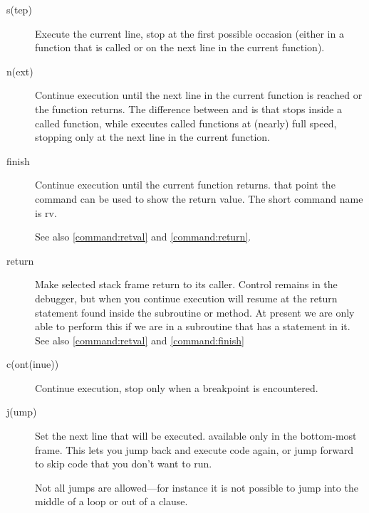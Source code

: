 \begin{description}

\item[s(tep) ]

Execute the current line, stop at the first possible occasion
(either in a function that is called or on the next line in the
current function).

\item[n(ext) ]

Continue execution until the next line in the current function
is reached or the function returns.  The difference between  and
 is that  stops inside a called function, while
 executes called functions at (nearly) full speed, 
stopping only at the next line in the current function.

\item[finish]\label{command:finish}

Continue execution until the current function returns.
that point the  command can be used to show the
return value. The short command name is rv.

See also \ref{command:retval} and \ref{command:return}.

\item[return]\label{command:return}

Make selected stack frame return to its caller. Control remains in the
debugger, but when you continue execution will resume at the return
statement found inside the subroutine or method.  At present we are
only able to perform this if we are in a subroutine that has a
 statement in it.  See also \ref{command:retval} and
\ref{command:finish}

\item[c(ont(inue))]

Continue execution, stop only when a breakpoint is encountered.

\item[j(ump) ]

Set the next line that will be executed. available only in the
bottom-most frame.  This lets you jump back and execute code
again, or jump forward to skip code that you don't want to run.

Not all jumps are allowed---for instance it
is not possible to jump into the middle of a  loop or out
of a  clause.

\end{description}

